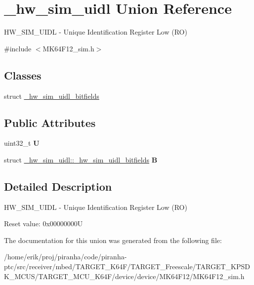 \hypertarget{union__hw__sim__uidl}{}\section{\+\_\+hw\+\_\+sim\+\_\+uidl Union Reference}
\label{union__hw__sim__uidl}


H\+W\+\_\+\+S\+I\+M\+\_\+\+U\+I\+DL -\/ Unique Identification Register Low (RO)  




{\ttfamily \#include $<$M\+K64\+F12\+\_\+sim.\+h$>$}

\subsection*{Classes}
\begin{DoxyCompactItemize}
\item 
struct \hyperlink{struct__hw__sim__uidl_1_1__hw__sim__uidl__bitfields}{\+\_\+hw\+\_\+sim\+\_\+uidl\+\_\+bitfields}
\end{DoxyCompactItemize}
\subsection*{Public Attributes}
\begin{DoxyCompactItemize}
\item 
uint32\+\_\+t {\bfseries U}\hypertarget{union__hw__sim__uidl_ab257620a1d4e54f79365b21e8286f21f}{}\label{union__hw__sim__uidl_ab257620a1d4e54f79365b21e8286f21f}

\item 
struct \hyperlink{struct__hw__sim__uidl_1_1__hw__sim__uidl__bitfields}{\+\_\+hw\+\_\+sim\+\_\+uidl\+::\+\_\+hw\+\_\+sim\+\_\+uidl\+\_\+bitfields} {\bfseries B}\hypertarget{union__hw__sim__uidl_ad25443ceedb8c2d0792ff1bad35d9f64}{}\label{union__hw__sim__uidl_ad25443ceedb8c2d0792ff1bad35d9f64}

\end{DoxyCompactItemize}


\subsection{Detailed Description}
H\+W\+\_\+\+S\+I\+M\+\_\+\+U\+I\+DL -\/ Unique Identification Register Low (RO) 

Reset value\+: 0x00000000U 

The documentation for this union was generated from the following file\+:\begin{DoxyCompactItemize}
\item 
/home/erik/proj/piranha/code/piranha-\/ptc/src/receiver/mbed/\+T\+A\+R\+G\+E\+T\+\_\+\+K64\+F/\+T\+A\+R\+G\+E\+T\+\_\+\+Freescale/\+T\+A\+R\+G\+E\+T\+\_\+\+K\+P\+S\+D\+K\+\_\+\+M\+C\+U\+S/\+T\+A\+R\+G\+E\+T\+\_\+\+M\+C\+U\+\_\+\+K64\+F/device/device/\+M\+K64\+F12/M\+K64\+F12\+\_\+sim.\+h\end{DoxyCompactItemize}
